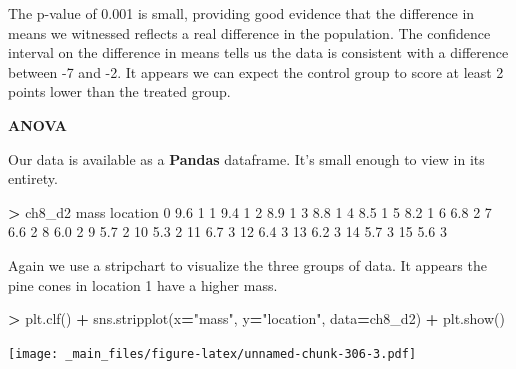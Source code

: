 \documentclass[
]{book}
\newenvironment{Shaded}{\begin{snugshade}}{\end{snugshade}}
\newcommand{\DecValTok}[1]{\textcolor[rgb]{0.00,0.00,0.81}{#1}}
\newcommand{\FloatTok}[1]{\textcolor[rgb]{0.00,0.00,0.81}{#1}}
\newcommand{\NormalTok}[1]{#1}
\newcommand{\OperatorTok}[1]{\textcolor[rgb]{0.81,0.36,0.00}{\textbf{#1}}}
\newcommand{\StringTok}[1]{\textcolor[rgb]{0.31,0.60,0.02}{#1}}
\begin{document}
The p-value of 0.001 is small, providing good evidence that the difference in means we witnessed reflects a real difference in the population. The confidence interval on the difference in means tells us the data is consistent with a difference between -7 and -2. It appears we can expect the control group to score at least 2 points lower than the treated group.

\textbf{ANOVA}

Our data is available as a \textbf{Pandas} dataframe. It's small enough to view in its entirety.

\begin{Shaded}
\begin{Highlighting}[]
\OperatorTok{\textgreater{}}\NormalTok{ ch8\_d2}
\NormalTok{    mass location}
\DecValTok{0}    \FloatTok{9.6}        \DecValTok{1}
\DecValTok{1}    \FloatTok{9.4}        \DecValTok{1}
\DecValTok{2}    \FloatTok{8.9}        \DecValTok{1}
\DecValTok{3}    \FloatTok{8.8}        \DecValTok{1}
\DecValTok{4}    \FloatTok{8.5}        \DecValTok{1}
\DecValTok{5}    \FloatTok{8.2}        \DecValTok{1}
\DecValTok{6}    \FloatTok{6.8}        \DecValTok{2}
\DecValTok{7}    \FloatTok{6.6}        \DecValTok{2}
\DecValTok{8}    \FloatTok{6.0}        \DecValTok{2}
\DecValTok{9}    \FloatTok{5.7}        \DecValTok{2}
\DecValTok{10}   \FloatTok{5.3}        \DecValTok{2}
\DecValTok{11}   \FloatTok{6.7}        \DecValTok{3}
\DecValTok{12}   \FloatTok{6.4}        \DecValTok{3}
\DecValTok{13}   \FloatTok{6.2}        \DecValTok{3}
\DecValTok{14}   \FloatTok{5.7}        \DecValTok{3}
\DecValTok{15}   \FloatTok{5.6}        \DecValTok{3}
\end{Highlighting}
\end{Shaded}

Again we use a stripchart to visualize the three groups of data. It appears the pine cones in location 1 have a higher mass.

\begin{Shaded}
\begin{Highlighting}[]
\OperatorTok{\textgreater{}}\NormalTok{ plt.clf()}
\OperatorTok{+}\NormalTok{ sns.stripplot(x}\OperatorTok{=}\StringTok{"mass"}\NormalTok{, y}\OperatorTok{=}\StringTok{"location"}\NormalTok{, data}\OperatorTok{=}\NormalTok{ch8\_d2)}
\OperatorTok{+}\NormalTok{ plt.show()}
\end{Highlighting}
\end{Shaded}

\texttt{[image: \_main\_files/figure-latex/unnamed-chunk-306-3.pdf]}
\end{document}
